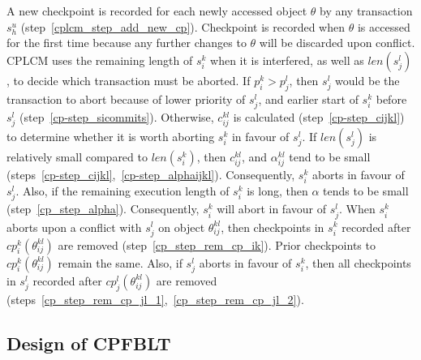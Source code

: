 \documentclass[conference]{IEEEtran}
\begin{document}
A new checkpoint is recorded for each newly accessed object $\theta$ by any transaction $s_h^u$ (step~\ref{cplcm_step_add_new_cp}). Checkpoint is recorded when $\theta$ is accessed for the first time because any further changes to $\theta$ will be discarded upon conflict. CPLCM uses the remaining length of $s_{i}^{k}$ when it is interfered, as well as $len(s_{j}^{l})$, to decide which transaction must be aborted. If $p_i^k > p_j^l$, then $s_{j}^l$ would be the transaction to abort because of lower priority of $s_j^l$, and earlier start of $s_{i}^k$ before $s_j^l$ (step~\ref{cp-step_sicommits}). Otherwise, $c_{ij}^{kl}$ is calculated (step~\ref{cp-step_cijkl}) to determine whether it is worth aborting $s_{i}^k$ in favour of $s_{j}^l$. If $len(s_j^l)$ is relatively small compared to $len(s_i^k)$, then $c_{ij}^{kl}$, and $\alpha_{ij}^{kl}$ tend to be small (steps~\ref{cp-step_cijkl},~\ref{cp-step_alphaijkl}). Consequently, $s_i^k$ aborts in favour of $s_j^l$. Also, if the remaining execution length of $s_i^k$ is long, then $\alpha$ tends to be small (step~\ref{cp_step_alpha}). Consequently, $s_i^k$ will abort in favour of $s_j^l$. When $s_i^k$ aborts upon a conflict with $s_j^l$ on object $\theta_{ij}^{kl}$, then checkpoints in $s_i^k$ recorded after $cp_i^k(\theta_{ij}^{kl})$ are removed (step~\ref{cp_step_rem_cp_ik}). Prior checkpoints to $cp_i^k(\theta_{ij}^{kl})$ remain the same. Also, if $s_j^l$ aborts in favour of $s_i^k$, then all checkpoints in $s_j^l$ recorded after $cp_j^l(\theta_{ij}^{kl})$ are removed (steps~\ref{cp_step_rem_cp_jl_1},~\ref{cp_step_rem_cp_jl_2}).

\subsection{Design of CPFBLT}\label{sec:design_cpfblt}
\end{document}
